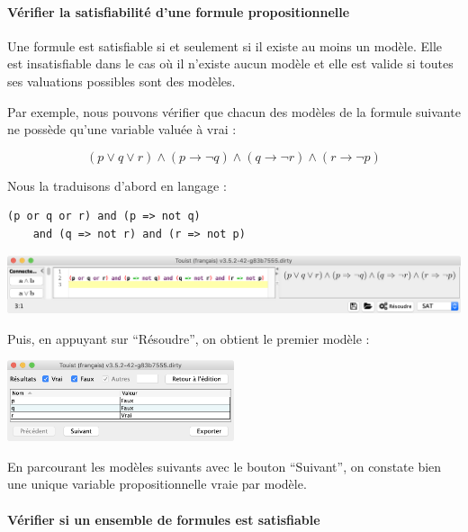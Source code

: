 \paragraph{Vérifier la satisfiabilité d'une formule propositionnelle} Une formule est satisfiable si et seulement si il existe au moins un modèle. Elle est insatisfiable dans le cas où il n'existe aucun modèle et elle est valide si toutes ses valuations possibles sont des modèles.

Par exemple, nous pouvons vérifier que chacun des modèles de la formule suivante ne possède qu'une variable valuée à vrai :

\[(p \vee q \vee r) \wedge (p \rightarrow \neg q) \wedge (q \rightarrow \neg r) \wedge (r\rightarrow \neg p)\]

\noindent
Nous la traduisons d'abord en langage \touist :

\begin{lstlisting}[language=touist,frame=single]
(p or q or r) and (p => not q)
    and (q => not r) and (r => not p)
\end{lstlisting}

\begin{center}
    \includegraphics[width=\textwidth]{figures/screenshot-formule.png}
\end{center}

\noindent
Puis, en appuyant sur \enquote{Résoudre}, on obtient le premier modèle :

\begin{center}
    \includegraphics[width=0.5\textwidth]{figures/screenshot-modele.png} \label{fig:screenshot-modele}    
\end{center}

\noindent
En parcourant les modèles suivants avec le bouton \enquote{Suivant}, on constate bien une unique variable propositionnelle vraie par modèle.

\paragraph{Vérifier si un ensemble de formules est satisfiable}

